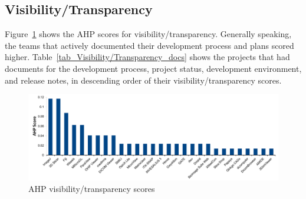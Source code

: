 \documentclass[final, 3p, times, authoryear]{elsarticle}
\begin{document}
\subsection{Visibility/Transparency} \label{sec_result_visibility_transparency}

Figure~\ref{fg_visibility_transparency_scores} shows the AHP scores for
visibility/transparency. Generally speaking, the teams that actively documented
their development process and plans scored higher.
Table~\ref{tab_Visibility/Transparency_docs} shows the projects that had
documents for the development process, project status, development environment,
and release notes, in descending order of their visibility/transparency
scores.

\begin{figure}[!ht]
\includegraphics[scale=0.48]{figures/visibility_transparency_scores.pdf}
\caption{AHP visibility/transparency scores}
\label{fg_visibility_transparency_scores}
\end{figure}
\end{document}
